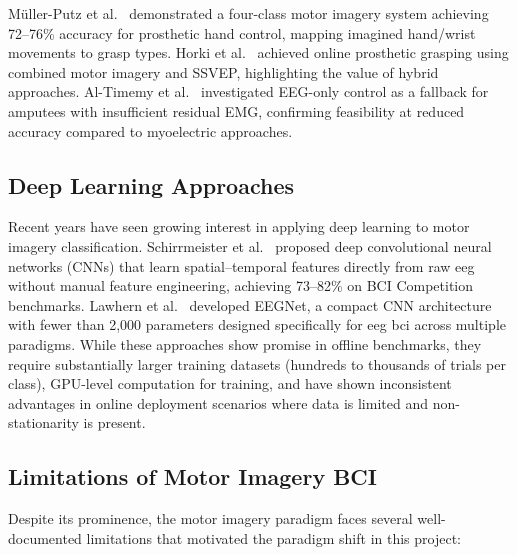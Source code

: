 M\"{u}ller-Putz et al.~\cite{mullerputz2008prosthetic} demonstrated
a four-class motor imagery system achieving 72--76\% accuracy for
prosthetic hand control, mapping imagined hand/wrist movements to
grasp types. Horki et al.~\cite{horki2011combined} achieved online
prosthetic grasping using combined motor imagery and SSVEP,
highlighting the value of hybrid approaches. Al-Timemy
et al.~\cite{al2013classification} investigated EEG-only control
as a fallback for amputees with insufficient residual EMG, confirming
feasibility at reduced accuracy compared to myoelectric approaches.

\subsection{Deep Learning Approaches}

Recent years have seen growing interest in applying deep learning
to motor imagery classification. Schirrmeister et al.~\cite{schirrmeister2017deep}
proposed deep convolutional neural networks (CNNs) that learn
spatial--temporal features directly from raw \acrshort{eeg} without
manual feature engineering, achieving 73--82\% on BCI Competition
benchmarks. Lawhern et al.~\cite{lawhern2018eegnet} developed EEGNet,
a compact CNN architecture with fewer than 2{,}000 parameters designed
specifically for \acrshort{eeg} \acrshort{bci} across multiple
paradigms. While these approaches show promise in offline benchmarks,
they require substantially larger training datasets (hundreds to
thousands of trials per class), GPU-level computation for training,
and have shown inconsistent advantages in online deployment scenarios
where data is limited and non-stationarity is present.

\subsection{Limitations of Motor Imagery BCI}

Despite its prominence, the motor imagery paradigm faces several
well-documented limitations that motivated the paradigm shift in
this project:

